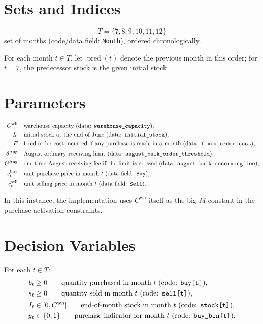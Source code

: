 \section*{Sets and Indices}

\[
T=\{7,8,9,10,11,12\}
\]
set of months (code/data field: \texttt{Month}), ordered chronologically.

For each month \(t\in T\), let \(\operatorname{pred}(t)\) denote the previous month in this order; for \(t=7\), the predecessor stock is the given initial stock.

\section*{Parameters}

\begin{align*}
C^{\text{wh}} & \quad \text{warehouse capacity (data: \texttt{warehouse\_capacity})},\\
I_0 & \quad \text{initial stock at the end of June (data: \texttt{initial\_stock})},\\
F & \quad \text{fixed order cost incurred if any purchase is made in a month (data: \texttt{fixed\_order\_cost})},\\
\theta^{\text{Aug}} & \quad \text{August ordinary receiving limit (data: \texttt{august\_bulk\_order\_threshold})},\\
G^{\text{Aug}} & \quad \text{one-time August receiving fee if the limit is crossed (data: \texttt{august\_bulk\_receiving\_fee})},\\
c_t^{\text{buy}} & \quad \text{unit purchase price in month \(t\) (data field: \texttt{Buy})},\\
c_t^{\text{sell}} & \quad \text{unit selling price in month \(t\) (data field: \texttt{Sell})}.
\end{align*}

In this instance, the implementation uses \(C^{\text{wh}}\) itself as the big-\(M\) constant in the purchase-activation constraints.

\section*{Decision Variables}

For each \(t\in T\):
\begin{align*}
b_t &\ge 0 \qquad \text{quantity purchased in month \(t\) (code: \texttt{buy[t]}),}\\
s_t &\ge 0 \qquad \text{quantity sold in month \(t\) (code: \texttt{sell[t]}),}\\
I_t &\in [0,C^{\text{wh}}] \qquad \text{end-of-month stock in month \(t\) (code: \texttt{stock[t]}),}\\
y_t &\in \{0,1\} \qquad \text{purchase indicator for month \(t\) (code: \texttt{buy\_bin[t]}).}
\end{align*}

